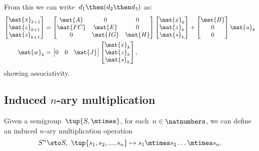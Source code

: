 From this we can write~$d_1\then (d_2\then d_3)$ as:
\begin{equation*}
  \label{eq:dlin-7}
  \begin{aligned}
    \begin{bmatrix}
      \mat{x}_{k+1}\\
      \mat{z}_{k+1}\\
      \mat{s}_{k+1}
    \end{bmatrix}&=
    \begin{bmatrix}
      \mat{A}&0&0\\
      \mat{FC}&\mat{E}&0\\
      0&\mat{IG}&\mat{H}
    \end{bmatrix}\begin{bmatrix}
                   \mat{x}_k\\ \mat{z}_k\\ \mat{s}_k
    \end{bmatrix}+
    \begin{bmatrix}
      \mat{B}\\ 0\\ 0
    \end{bmatrix}\mat{u}_k\\
    \mat{w}_k&=\begin{bmatrix} 0&0&\mat{J}\end{bmatrix}\begin{bmatrix}\mat{x}_k\\ \mat{z}_k\\ \mat{s}_k\end{bmatrix},
  \end{aligned}
\end{equation*}
showing associativity.

\subsection{Induced $n$-ary multiplication}
Given a semigroup~$\tup{S, \mtimes}$, for each~$n \in \natnumbers$, we can define an induced $n$-ary multiplication operation
\begin{equation*}
  S^n \sto S, \ \tup{s_1, s_2, ..., s_n} \mapsto s_1 \mtimes s_2 \dots \mtimes s_n.
\end{equation*}




